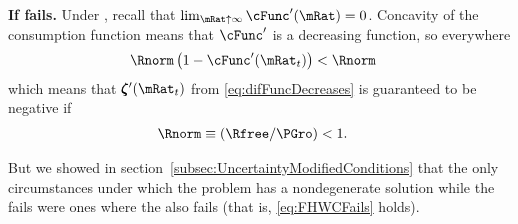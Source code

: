 \documentclass[\econtexRoot/BufferStockTheory]{subfiles}
\begin{document}
\textbf{If {\RIC} fails.}
Under \cncl{\RIC}, recall that $\lim_{\mRat \uparrow \infty} \cFunc^{\prime}(\mRat) = 0$.  Concavity of the consumption function means that $\cFunc^{\prime}$ is a decreasing function, so everywhere 
\begin{align*}
  \Rnorm\left(1-\cFunc^{\prime}({\mRat}_t)\right) & < \Rnorm
\end{align*}
which means that $\difFunc^{\prime}(\mRat_{t})$ from \eqref{eq:difFuncDecreases} is guaranteed to be negative if
\begin{align}
  \Rnorm \equiv (\Rfree/\PGro) & < 1  \label{eq:FHWCFails}.
\end{align}

But we showed in section~\ref{subsec:UncertaintyModifiedConditions} that the only circumstances under which the problem has a nondegenerate solution while the {\RIC} fails were ones where the {\FHWC} also fails (that is, \eqref{eq:FHWCFails} holds).

\begin{comment}
\subsection{Comment}
\subsection{Proof of Lemma}



Due to the model's nonlinearities the values of $\mRat$ at which the expected growth rate of $\cLevBF$ matches $\PGro$ is very slightly different from the $\mRat$ at which the growth rate at which expected growth of $\mLevBF$ is $\PGro$.  Defining $\grave{\mRat}$ as the $\mRat$ at which $\Ex_{t}[\cRatBF_{t+1}/\cRatBF_{t}]=\PGro$, we can show that to first order $\grave{\mRat} \approx \check{\mRat}.$
\begin{align*}
  \Ex_{t}[\cFunc(\mRat_{t+1})\pShk_{t+1}] & = \cFunc(\mRat_{t}) \label{eq:balgrostableC}.
  \\ \Ex_{t}[\left(\cFunc(\grave{\mRat})+\cFunc^{\prime}(\grave{\mRat})(\mRat_{t+1}-\grave{\mRat})\right)\pShk_{t+1}] & \approx \cFunc(\grave{\mRat})
  \\ \Ex_{t}[\left(\cFunc^{\prime}(\grave{\mRat})(\mRat_{t+1}-\grave{\mRat})\right)\pShk_{t+1}] & \approx 0
  \\ \Ex_{t}[\mRat_{t+1}] & \approx \grave{\mRat} 
\end{align*}
but at $\mRat=\check{\mRat}$, $\Ex_{t}[\mRat_{t+1}]=\check{\mRat}\approx\grave{\mRat}$.
\end{comment}
\end{document}
